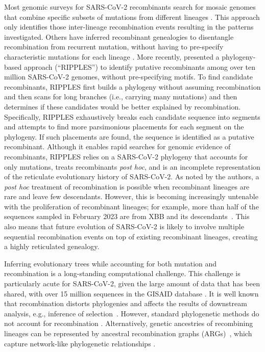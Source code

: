 \documentclass{article}
\begin{document}
Most genomic surveys for SARS-CoV-2 recombinants search for mosaic genomes that combine specific subsets of mutations from different lineages \citep[e.g.][]{VanInsberghe2021-eu,Jackson2021-ik,Wertheim2022-hj,Sekizuka2022-xz}. This approach only identifies those inter-lineage recombination events resulting in the patterns investigated. Others have inferred recombinant genealogies to disentangle recombination from recurrent mutation, without having to pre-specify characteristic mutations for each lineage \citep{Ignatieva2021-rg}. More recently, \cite{Turakhia2022-it} presented a phylogeny-based approach (``RIPPLES'') to identify putative recombinants among over ten million SARS-CoV-2 genomes, without pre-specifying motifs. To find candidate recombinants, RIPPLES first builds a phylogeny without assuming recombination and then scans for long branches (i.e., carrying many mutations) and then determines if these candidates would be better explained by recombination. Specifically, RIPPLES exhaustively breaks each candidate sequence into segments and attempts to find more parsimonious placements for each segment on the phylogeny. If such placements are found, the sequence is identified as a putative recombinant. Although it enables rapid searches for genomic evidence of recombinants, RIPPLES relies on a SARS-CoV-2 phylogeny that accounts for only mutations, treats recombinants \textit{post hoc}, and is an incomplete representation of the reticulate evolutionary history of SARS-CoV-2. As noted by the authors, a \textit{post hoc} treatment of recombination is possible when recombinant lineages are rare and leave few descendants. However, this is becoming increasingly untenable with the proliferation of recombinant lineages; for example, more than half of the sequences sampled in February 2023 are from XBB and its descendants~\citep{Chen2022-pz}. This also means that future evolution of SARS-CoV-2 is likely to involve multiple sequential recombination events on top of existing recombinant lineages, creating a highly reticulated genealogy.

Inferring evolutionary trees while accounting for both mutation and
recombination is a long-standing computational challenge. This challenge is
particularly acute for SARS-CoV-2, given the large amount of data that has been
shared, with over 15 million sequences in the GISAID database
\citep{Shu2017-hp}. It is well known that recombination distorts phylogenies
\citep{Schierup2000-fg} and affects the results of downstream analysis, e.g.,
inference of selection~\citep{Anisimova2003-vr}. However, standard phylogenetic
methods do not account for recombination
\citep[e.g.][]{Ronquist2012-zw,Minh2020-lr,Guindon2003-zd}. Alternatively,
genetic ancestries of recombining lineages can be represented by ancestral
recombination graphs (ARGs)~\citep{Griffiths1998-ancestral,Wong2023-efficient},
which
capture network-like phylogenetic relationships \citep{Gusfield2014-qw}.
\end{document}
